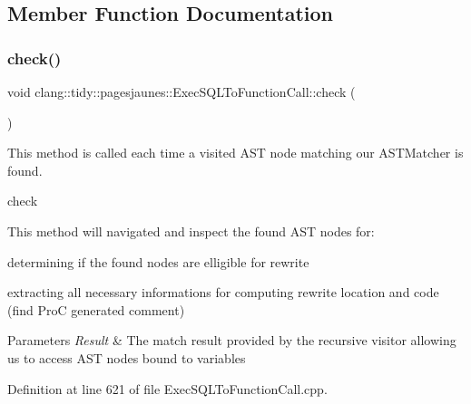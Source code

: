 \subsection{Member Function Documentation}
\mbox{\label{classclang_1_1tidy_1_1pagesjaunes_1_1_exec_s_q_l_to_function_call_a15f33432a67829e8f95279db8624940f}} 
\subsubsection{\texorpdfstring{check()}{check()}}
{\footnotesize\ttfamily void clang\+::tidy\+::pagesjaunes\+::\+Exec\+S\+Q\+L\+To\+Function\+Call\+::check (\begin{DoxyParamCaption}\item[{const ast\+\_\+matchers\+::\+Match\+Finder\+::\+Match\+Result \&}]{ }\end{DoxyParamCaption})\hspace{0.3cm}{\ttfamily [override]}}



This method is called each time a visited A\+ST node matching our A\+S\+T\+Matcher is found. 

check

This method will navigated and inspect the found A\+ST nodes for\+:
\begin{DoxyItemize}
\item determining if the found nodes are elligible for rewrite
\item extracting all necessary informations for computing rewrite location and code (find ProC generated comment)
\end{DoxyItemize}


\begin{DoxyParams}{Parameters}
{\em Result} & The match result provided by the recursive visitor allowing us to access A\+ST nodes bound to variables \\
\hline
\end{DoxyParams}


Definition at line 621 of file Exec\+S\+Q\+L\+To\+Function\+Call.\+cpp.

\mbox{\label{classclang_1_1tidy_1_1pagesjaunes_1_1_exec_s_q_l_to_function_call_a43d0b0f8abcb795069e164126dfa1db3}} 
